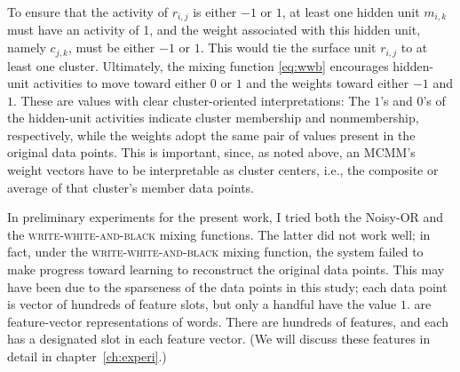 To ensure that the activity of $r_{i,j}$ is either $-1$ or $1$, at least one hidden 
unit $m_{i,k}$ must have an activity of 1, and the weight associated with this 
hidden unit, namely $c_{j,k}$, must be either $-1$ or $1$. This would tie 
the surface unit $r_{i,j}$ to at least one cluster. Ultimately, the mixing 
function \eqref{eq:wwb} encourages hidden-unit activities to move  toward 
either $0$ or $1$ and the weights toward either $-1$ and $1$. These are 
values with clear cluster-oriented interpretations: The $1$'s and $0$'s of the 
hidden-unit activities indicate cluster membership and nonmembership, respectively, 
while the weights adopt the same pair of values present in the original data points. 
This is important, since, as noted above, an MCMM's weight vectors have to be 
interpretable as cluster centers, i.e., the composite or average of that cluster's 
member data points. %

In preliminary experiments for the present work, I tried both the Noisy-OR 
and the \textsc{write-white-and-black} mixing functions. The latter did 
not work well; in fact, under the \textsc{write-white-and-black} mixing function, the system 
failed to make progress toward learning to reconstruct the original 
data points. This may have been due to the sparseness of the data points 
in this study; each data point is vector of hundreds of feature slots, but 
only a handful have the value $1$. are feature-vector representations of words. 
There are hundreds of features, and each has a designated slot in each feature vector.
(We will discuss these features in detail in chapter~\ref{ch:experi}.)

